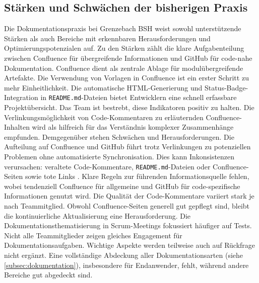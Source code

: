 \documentclass[12pt,oneside]{article}
\begin{document}
    \subsection{Stärken und Schwächen der bisherigen Praxis}
    \label{subsec:ss_dok}
    Die Dokumentationspraxis bei Grenzebach BSH weist sowohl unterstützende Stärken als auch Bereiche mit erkennbaren Herausforderungen und Optimierungspotenzialen auf.
    \newline
    Zu den Stärken zählt die klare Aufgabenteilung zwischen Confluence für übergreifende Informationen und GitHub für code-nahe Dokumentation. Confluence dient als zentrale Ablage für modulübergreifende Artefakte. Die Verwendung von Vorlagen in Confluence ist ein erster Schritt zu mehr Einheitlichkeit. Die automatische HTML-Generierung und Status-Badge-Integration in \texttt{README.md}-Dateien bietet Entwicklern eine schnell erfassbare Projektübersicht. Das Team ist bestrebt, diese Indikatoren positiv zu halten. Die Verlinkungsmöglichkeit von Code-Kommentaren zu erläuternden Confluence-Inhalten wird als hilfreich für das Verständnis komplexer Zusammenhänge empfunden.
    \newline
    Demgegenüber stehen Schwächen und Herausforderungen. Die Aufteilung auf Confluence und GitHub führt trotz Verlinkungen zu potenziellen Problemen ohne automatisierte Synchronisation. Dies kann Inkonsistenzen verursachen: veraltete Code-Kommentare, \texttt{README.md}-Dateien oder Confluence-Seiten sowie tote Links \cite{webmakers2024}. Klare Regeln zur führenden Informationsquelle fehlen, wobei tendenziell Confluence für allgemeine und GitHub für code-spezifische Informationen genutzt wird. Die Qualität der Code-Kommentare variiert stark je nach Teammitglied. Obwohl Confluence-Seiten generell gut gepflegt sind, bleibt die kontinuierliche Aktualisierung eine Herausforderung. Die Dokumentationsthematisierung in Scrum-Meetings fokussiert häufiger auf Tests. Nicht alle Teammitglieder zeigen gleiches Engagement für Dokumentationsaufgaben. Wichtige Aspekte werden teilweise auch auf Rückfrage nicht ergänzt. Eine vollständige Abdeckung aller Dokumentationsarten (siehe \ref{subsec:dokumentation}), insbesondere für Endanwender, fehlt, während andere Bereiche gut abgedeckt sind.
\end{document}
